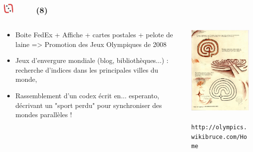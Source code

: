 \documentclass[slidetop,11pt]{beamer}
\def\moreInFrameTitleLeftt{\includegraphics[height=0.5cm]{img/ligueludique-0.png}~~~~~}
\begin{document}
\begin{frame}
	\frametitle{\moreInFrameTitleLeftt \sectionPartIIaIV  (8) }
	\begin{columns}[T]
		\begin{column}[T]{5.05cm}
			\begin{itemize}
				\item Boite FedEx + Affiche + cartes postales + pelote de laine => Promotion des Jeux Olympiques de 2008
				\item Jeux d'envergure mondiale (blog, biblioth{\`e}ques...) : recherche d'indices dans les principales villes du monde, 
				\item Rassemblement d'un codex {\'e}crit en... esperanto, d{\'e}crivant un "sport perdu" pour synchroniser des mondes parall{\`e}les !
			\end{itemize}
		\end{column}
		\begin{column}[T]{5.05cm}
			\includegraphics[width=5.00cm]{img/argTheLostRing/430px-CotLR-4Ap2.jpg}~\\
			\texttt{\footnotesize http://olympics.wikibruce.com/Home}
		\end{column}
	\end{columns}
\end{frame}

\def\sectionPartIIaV{Majestic}
\end{document}
